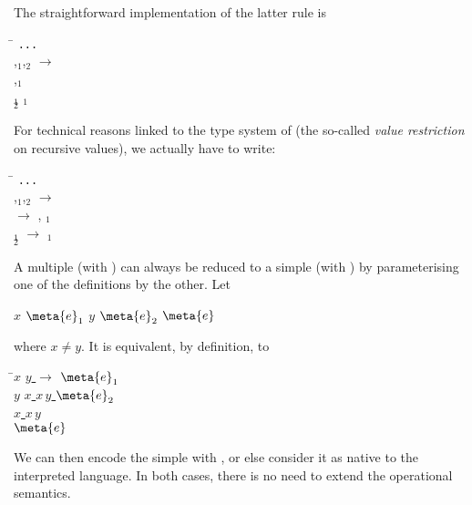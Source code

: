 The straightforward implementation of the latter rule is
\begin{tabbing}
 \Xlet \= \Xrec {}   \equal
 \Xmatch {} \Xwith \texttt{...} \\
 \vbar \>  \lpar{},$_1$,$_2$\rpar{}
 $\rightarrow$\\
 \> \quad \Xlet \Xrec {} \equal {}
 \lpar{},$_1$\rpar{} \\
 \> \quad \Xand {}$_1$ \equal {}  $_1$\\
 \> \quad \Xin {}  $_2$
\end{tabbing}
\noindent For technical reasons linked to the type system of \OCaml
(the so\hyp{}called \emph{value restriction} on recursive values), we
actually have to write:
\begin{tabbing}
 \Xlet \= \Xrec {}   \equal
 \Xmatch {} \Xwith \texttt{...} \\
 \vbar \> 
 \lpar{},$_1$,$_2$\rpar{} $\rightarrow$\\
 \> \quad \Xlet \Xrec {} \equal \underline{\Xfun
  $\rightarrow$} 
 \lpar{}, $_1$\underline{\lpar\rpar}\rpar{}  \underline{}\\
 \> \quad \Xand {}$_1$ \equal \underline{\Xfun \lpar\rpar{}
 $\rightarrow$}   $_1$\\
 \> \quad \Xin {}  $_2$
\end{tabbing}
A multiple \Xlet \Xrec (with \Xand) can always be reduced to
a simple \Xlet \Xrec (with \Xin) by parameterising one of the
definitions by the other. Let
\begin{center}
\Xlet \Xrec $x$ \equal $\meta{e}_1$ \Xand $y$ \equal $\meta{e}_2$ \Xin
$\meta{e}$
\end{center}
where $x \neq y$. It is equivalent, by definition, to
\begin{tabbing}
\Xlet \= \Xrec $x$ \equal \underline{\Xfun $y$
  $\rightarrow$} $\meta{e}_1$ \Xin\\
\> \Xlet \Xrec $y$ \equal \underline{\Xlet $x$ \equal $x \, y$
  \Xin} $\meta{e}_2$ \Xin\\
\> \underline{\Xlet $x$ \equal $x \, y$}\\
\underline{\Xin} $\meta{e}$
\end{tabbing}
We can then encode the simple \Xlet \Xrec with , or else
consider it as native to the interpreted language. In both cases,
there is no need to extend the operational semantics.

